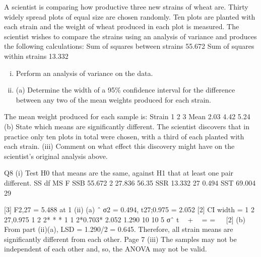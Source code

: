 \documentclass[a4paper,12pt]{article}
\begin{document}
A scientist is comparing how productive three new strains of wheat are. Thirty widely spread plots of equal size are chosen randomly. Ten plots are planted with each strain and the weight of wheat produced in each plot is measured. The scientist
wishes to compare the strains using an analysis of variance and produces the
following calculations:
  Sum of squares between strains 55.672
Sum of squares within strains 13.332
\begin{enumerate}[(i)]
\item Perform an analysis of variance on the data. 
\item  (a) Determine the width of a 95\% confidence interval for the difference
between any two of the mean weights produced for each strain. 
\end{enumerate}
The mean weight produced for each sample is:
  Strain 1 2 3
Mean 2.03 4.42 5.24
(b) State which means are significantly different. 
The scientist discovers that in practice only ten plots in total were chosen, with a third of each planted with each strain.
(iii) Comment on what effect this discovery might have on the scientist’s original analysis above. 


\newpage

Q8 (i) Test H0 that means are the same, against H1 that at least one pair different.
SS df MS F
SSB 55.672 2 27.836 56.35
SSR 13.332 27 0.494
SST 69.004 29

[3]
F2,27 = 5.488 at 1%
(ii) (a) ˆ σ2 = 0.494, t27;0.975 = 2.052 [2]
CI width =
  1
2
27,0.975 1
2
2* * * 1 1 2*0.703* 2.052 1.290
10 10
5
σˆ t  +  = =
   
[2]
(b) From part (ii)(a), LSD = 1.290/2 = 0.645. Therefore, all strain means are significantly different from each other. 
Page 7
(iii) The samples may not be independent of each other and, so, the ANOVA may not be valid. 


\end{document}
